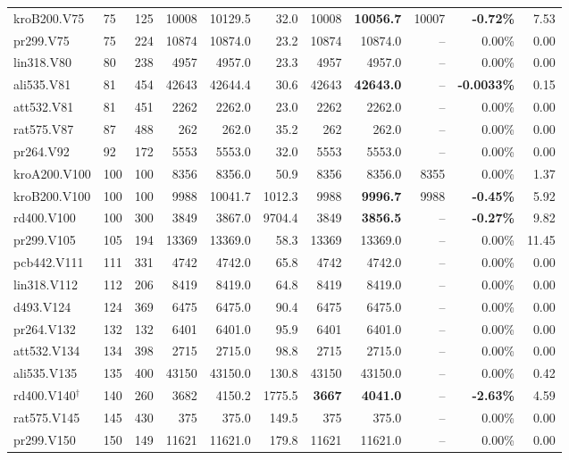 {\begin{longtable}{llr rrr rrr r r}
kroB200.V75 & 75 & 125 & 10008 & 10129.5 & 32.0 & 10008 & \textbf{10056.7} & 10007 & \textbf{-0.72\%} & 7.53 \\
pr299.V75 & 75 & 224 & 10874 & 10874.0 & 23.2 & 10874 & 10874.0 & -- & 0.00\% & 0.00 \\
lin318.V80 & 80 & 238 & 4957 & 4957.0 & 23.3 & 4957 & 4957.0 & -- & 0.00\% & 0.00 \\
ali535.V81 & 81 & 454 & 42643 & 42644.4 & 30.6 & 42643 & \textbf{42643.0} & -- & \textbf{-0.0033\%} & 0.15 \\
att532.V81 & 81 & 451 & 2262 & 2262.0 & 23.0 & 2262 & 2262.0 & -- & 0.00\% & 0.00 \\
rat575.V87 & 87 & 488 & 262 & 262.0 & 35.2 & 262 & 262.0 & -- & 0.00\% & 0.00 \\
pr264.V92 & 92 & 172 & 5553 & 5553.0 & 32.0 & 5553 & 5553.0 & -- & 0.00\% & 0.00 \\
kroA200.V100 & 100 & 100 & 8356 & 8356.0 & 50.9 & 8356 & 8356.0 & 8355 & 0.00\% & 1.37 \\
kroB200.V100 & 100 & 100 & 9988 & 10041.7 & 1012.3 & 9988 & \textbf{9996.7} & 9988 & \textbf{-0.45\%} & 5.92 \\
rd400.V100 & 100 & 300 & 3849 & 3867.0 & 9704.4 & 3849 & \textbf{3856.5} & -- & \textbf{-0.27\%} & 9.82 \\
pr299.V105 & 105 & 194 & 13369 & 13369.0 & 58.3 & 13369 & 13369.0 & -- & 0.00\% & 11.45 \\
pcb442.V111 & 111 & 331 & 4742 & 4742.0 & 65.8 & 4742 & 4742.0 & -- & 0.00\% & 0.00 \\
lin318.V112 & 112 & 206 & 8419 & 8419.0 & 64.8 & 8419 & 8419.0 & -- & 0.00\% & 0.00 \\
d493.V124 & 124 & 369 & 6475 & 6475.0 & 90.4 & 6475 & 6475.0 & -- & 0.00\% & 0.00 \\
pr264.V132 & 132 & 132 & 6401 & 6401.0 & 95.9 & 6401 & 6401.0 & -- & 0.00\% & 0.00 \\
att532.V134 & 134 & 398 & 2715 & 2715.0 & 98.8 & 2715 & 2715.0 & -- & 0.00\% & 0.00 \\
ali535.V135 & 135 & 400 & 43150 & 43150.0 & 130.8 & 43150 & 43150.0 & -- & 0.00\% & 0.42 \\
rd400.V140$^\dagger$ & 140 & 260 & 3682 & 4150.2 & 1775.5 & \textbf{3667} & \textbf{4041.0} & -- & \textbf{-2.63\%} & 4.59 \\
rat575.V145 & 145 & 430 & 375 & 375.0 & 149.5 & 375 & 375.0 & -- & 0.00\% & 0.00 \\
pr299.V150 & 150 & 149 & 11621 & 11621.0 & 179.8 & 11621 & 11621.0 & -- & 0.00\% & 0.00 \\

\end{longtable}}
